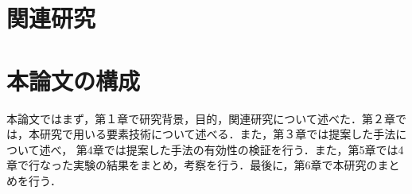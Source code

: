 \documentclass[../main]{subfiles}
\begin{document}
        \newpage

        \section{関連研究}
        \section{本論文の構成}
        本論文ではまず，第１章で研究背景，目的，関連研究について述べた．第２章では，本研究で用いる要素技術について述べる．また，第３章では提案した手法について述べ，
        第4章では提案した手法の有効性の検証を行う．また，第5章では4章で行なった実験の結果をまとめ，考察を行う．最後に，第6章で本研究のまとめを行う．
\end{document}
